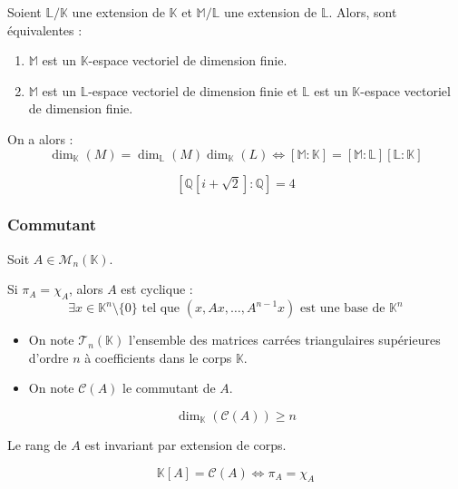 	\begin{corollary}
		Soient $\mathbb{L}/\mathbb{K}$ une extension de $\mathbb{K}$ et $\mathbb{M}/\mathbb{L}$ une extension de $\mathbb{L}$. Alors, sont équivalentes :
		\begin{enumerate}[label=(\roman*)]
			\item $\mathbb{M}$ est un $\mathbb{K}$-espace vectoriel de dimension finie.
			\item $\mathbb{M}$ est un $\mathbb{L}$-espace vectoriel de dimension finie et $\mathbb{L}$ est un $\mathbb{K}$-espace vectoriel de dimension finie.
		\end{enumerate}
		On a alors :
		\[ \dim_{\mathbb{K}}(M) = \dim_{\mathbb{L}}(M) \dim_{\mathbb{K}}(L) \iff [\mathbb{M}:\mathbb{K}] = [\mathbb{M}:\mathbb{L}] [\mathbb{L}:\mathbb{K}] \]
	\end{corollary}


	\begin{example}
		\[ [\mathbb{Q}[i + \sqrt{2}]:\mathbb{Q}] = 4 \]
	\end{example}

	\subsubsection{Commutant}

	Soit $A \in \mathcal{M}_n(\mathbb{K})$.


	\begin{lemma}
		Si $\pi_A = \chi_A$, alors $A$ est cyclique :
		\[ \exists x \in \mathbb{K}^n \setminus \{ 0 \} \text{ tel que } (x, Ax, \dots, A^{n-1}x) \text{ est une base de } \mathbb{K}^n \]
	\end{lemma}


	\begin{notation}
		\begin{itemize}
			\item On note $\mathcal{T}_n(\mathbb{K})$ l'ensemble des matrices carrées triangulaires supérieures d'ordre $n$ à coefficients dans le corps $\mathbb{K}$.
			\item On note $\mathcal{C}(A)$ le commutant de $A$.
		\end{itemize}
	\end{notation}

	\begin{lemma}
		\[ \dim_{\mathbb{K}}(\mathcal{C}(A)) \geq n \]
	\end{lemma}

	\begin{lemma}
		Le rang de $A$ est invariant par extension de corps.
	\end{lemma}


	\begin{theorem}
		\[ \mathbb{K}[A] = \mathcal{C}(A) \iff \pi_A = \chi_A \]
	\end{theorem}

